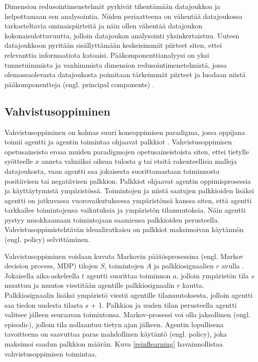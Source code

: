 \documentclass[utf8]{gradu3}
\begin{document}
Dimension redusointimenetelmät pyrkivät tihentämään datajoukkoa ja helpottamaan sen analysointia. Niiden periaatteena on vähentää datajoukossa tarkasteltavia ominaispiirteitä ja näin ollen vähentää datajoukon kokonaisulottuvuutta, jolloin datajoukon analysointi yksinkertaistuu. Uuteen datajoukkoon pyritään sisällyttämään keskeisimmät piirteet siten, ettei relevanttia informaatiota katoaisi. Pääkomponenttianalyysi on yksi tunnetuimmista ja vanhimmista dimension redusointimenetelmistä, jossa olemassaolevasta datajoukosta poimitaan tärkeimmät piirteet ja luodaan niistä pääkomponentteja (engl. principal components) \parencite{abdi2010principal}.

\subsection{Vahvistusoppiminen}

Vahvistusoppiminen on kolmas suuri koneoppimisen paradigma, jossa oppijana toimii agentti ja agentin toimintaa ohjaavat palkkiot \parencite{arulkumaran2017brief,li2018deep,jordan2015machine}. Vahvistusoppimisen opetusaineisto eroaa muiden paradigmojen opetusaineistoista siten, ettei tietylle syötteelle \(x\) anneta valmiiksi oikeaa tulosta \(y\) tai etsitä rakenteellisia malleja datajoukosta, vaan agentti saa jokaisesta suorittamastaan toiminnosta positiivisen tai negatiivisen palkkion. Palkkiot ohjaavat agentin oppimisprosessia ja käyttäytymistä ympäristössä. Toimintojen ja niistä saatujen palkkioiden lisäksi agentti on jatkuvassa vuorovaikutuksessa ympäristönsä kanssa siten, että agentti tarkkailee toimintojensa vaikutuksia ja ympäristön tilamuutoksia. Näin agentti pystyy muokkaamaan toimintojaan saamiensa palkkioiden perusteella. Vahvistusoppimistehtävän ideaaliratkaisu on palkkiot maksimoivan käytännön (engl. policy) selvittäminen.

Vahvistusoppiminen voidaan kuvata Markovin päätösprosessina (engl. Markov decision process, MDP) tilojen \(S\), toimintojen \(A\) ja palkkiosignaalien \(r\) avulla \parencite{arulkumaran2017brief}. Jokaisella aika-askeleella \(t\) agentti suorittaa toiminnon \(a\), jolloin ympäristön tila \(s\) muuttuu ja muutos viestitään agentille palkkiosignaalin \(r\) kautta. Palkkiosignaalin lisäksi ympäristö viestii agentille tilamuutoksesta, jolloin agentti saa tiedon uudesta tilasta \(s\) + 1. Palkkion ja uuden tilan perusteella agentti valitsee jälleen seuraavan toimintonsa. Markov-prosessi voi olla jaksollinen (engl. episodic), jolloin tila nollaantuu tietyn ajan jälkeen. Agentin lopullisena tavoitteena on saavuttaa paras mahdollinen käytäntö (engl. policy), joka maksimoi saadun palkkion määrän. Kuva \ref{reinflearning} havainnollistaa vahvistusoppimisen toimintaa.
\end{document}
